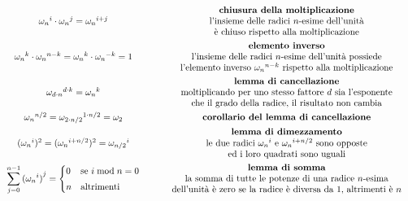 \[\begin{array}{c c}
	{\omega_n}^i \cdot {\omega_n}^j = {\omega_n}^{i+j} & \qquad \begin{array}{c}\textbf{chiusura della moltiplicazione} \\ \text{l'insieme delle radici \(n\)-esime dell'unità} \\ \text{è chiuso rispetto alla moltiplicazione}\end{array} \\[15pt]
	{\omega_n}^k \cdot {\omega_n}^{n-k} = {\omega_n}^k \cdot {\omega_n}^{-k} = 1 & \qquad \begin{array}{c}\textbf{elemento inverso} \\ \text{l'insieme delle radici \(n\)-esime dell'unità possiede} \\ \text{l'elemento inverso } {\omega_n}^{n-k} \text{ rispetto alla moltiplicazione}\end{array} \\[15pt]
	{\omega_{d \cdot n}}^{d \cdot k} = {\omega_n}^k & \qquad \begin{array}{c}\textbf{lemma di cancellazione} \\ \text{moltiplicando per uno stesso fattore } d \text{ sia l'esponente} \\ \text{che il grado della radice, il risultato non cambia}\end{array} \\[15pt]
	{\omega_n}^{n/2} = {\omega_{2 \cdot n/2}}^{1 \cdot n/2} = \omega_2 & \qquad \begin{array}{c}\textbf{corollario del lemma di cancellazione} \end{array} \\[4pt]
	({\omega_n}^i)^2 = ({\omega_n}^{i + n/2})^2 = {\omega_{n/2}}^i & \qquad \begin{array}{c}\textbf{lemma di dimezzamento} \\ \text{le due radici } {\omega_n}^i \text{ e }{\omega_n}^{i + n/2} \text{ sono opposte} \\ \text{ed i loro quadrati sono uguali}\end{array} \\[15pt]
	\displaystyle \sum_{j=0}^{n-1} {({\omega_n}^i)}^j = \begin{cases} 0 & \text{se } i \; \text{mod} \; n = 0 \\[3pt] n & \text{altrimenti} \end{cases} & \qquad \begin{array}{c}\textbf{lemma di somma} \\ \text{la somma di tutte le potenze di una radice } n\text{-esima} \\ \text{dell'unità è zero se la radice è diversa da 1, altrimenti è \(n\)}\end{array}
\end{array}\]
\vspace{0pt}

